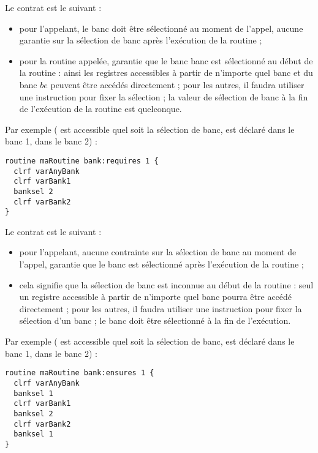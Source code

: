
Le contrat est le suivant :
\begin{itemize}
  \item pour l'appelant, le banc  doit être sélectionné au moment de l'appel, aucune garantie sur la sélection de banc après l'exécution de la routine ; 
  \item pour la routine appelée, garantie que le banc  banc est sélectionné au début de la routine : ainsi les registres accessibles à partir de n'importe quel banc et du banc $be$ peuvent être accédés directement ; pour les autres, il faudra utiliser une instruction  pour fixer la sélection ; la valeur de sélection de banc à la fin de l'exécution de la routine est quelconque.
\end{itemize}

Par exemple ( est accessible quel soit la sélection de banc,  est déclaré dans le banc 1,  dans le banc 2) :
\begin{lstlisting}[language=piccolo]
routine maRoutine bank:requires 1 {
  clrf varAnyBank
  clrf varBank1
  banksel 2
  clrf varBank2
}
\end{lstlisting}








Le contrat est le suivant :
\begin{itemize}
  \item pour l'appelant, aucune contrainte sur la sélection de banc au moment de l'appel, garantie que le banc  est sélectionné après l'exécution de la routine ; 
  \item cela signifie que la sélection de banc est inconnue au début de la routine : seul un registre accessible à partir de n'importe quel banc pourra être accédé directement ; pour les autres, il faudra utiliser une instruction  pour fixer la sélection d'un banc ; le banc  doit être sélectionné à la fin de l'exécution.
\end{itemize}

Par exemple ( est accessible quel soit la sélection de banc,  est déclaré dans le banc 1,  dans le banc 2) :
\begin{lstlisting}[language=piccolo]
routine maRoutine bank:ensures 1 {
  clrf varAnyBank
  banksel 1
  clrf varBank1
  banksel 2
  clrf varBank2
  banksel 1
}
\end{lstlisting}

